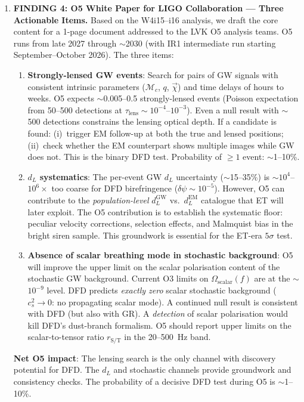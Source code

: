 \documentclass[11pt]{article}
\theoremstyle{definition}
\theoremstyle{remark}
\begin{document}
\begin{tcolorbox}[colback=blue!5!white, colframe=blue!60!black,
  title=\textbf{TOP 5 FINDINGS --- W4i17 P6 (Ranked by Impact)}]
\begin{enumerate}[nosep]
\item \textbf{FINDING 4: O5 White Paper for LIGO Collaboration ---
  Three Actionable Items.}
  Based on the W4i15--i16 analysis, we draft the core content for a
  1-page document addressed to the LVK O5 analysis teams. O5 runs
  from late 2027 through $\sim$2030 (with IR1 intermediate run starting
  September--October 2026). The three items:
  \begin{enumerate}[nosep, label=(\alph*)]
  \item \textbf{Strongly-lensed GW events}: Search for pairs of GW
    signals with consistent intrinsic parameters ($\mathcal{M}_c$,
    $q$, $\vec{\chi}$) and time delays of hours to weeks. O5 expects
    $\sim$0.005--0.5 strongly-lensed events (Poisson expectation from
    50--500 detections at $\tau_{\mathrm{lens}} \sim 10^{-4}$--$10^{-3}$).
    Even a null result with $\sim$500 detections constrains the lensing
    optical depth. If a candidate is found: (i)~trigger EM follow-up at
    both the true and lensed positions; (ii)~check whether the EM
    counterpart shows multiple images while GW does not. This is the
    binary DFD test. Probability of $\geq 1$ event: $\sim$1--10\%.
  \item \textbf{$d_L$ systematics}: The per-event GW $d_L$ uncertainty
    ($\sim$15--35\%) is $\sim$$10^4$--$10^6\times$ too coarse for DFD
    birefringence ($\delta\psi \sim 10^{-5}$). However, O5 can
    contribute to the \emph{population-level} $d_L^{\mathrm{GW}}$ vs.\
    $d_L^{\mathrm{EM}}$ catalogue that ET will later exploit. The O5
    contribution is to establish the systematic floor: peculiar velocity
    corrections, selection effects, and Malmquist bias in the bright
    siren sample. This groundwork is essential for the ET-era $5\sigma$
    test.
  \item \textbf{Absence of scalar breathing mode in stochastic
    background}: O5 will improve the upper limit on the scalar
    polarisation content of the stochastic GW background. Current O3
    limits on $\Omega_{\mathrm{scalar}}(f)$ are at the $\sim$$10^{-9}$
    level. DFD predicts \emph{exactly zero} scalar stochastic
    background ($c_s^2 \to 0$: no propagating scalar mode). A continued
    null result is consistent with DFD (but also with GR). A
    \emph{detection} of scalar polarisation would kill DFD's dust-branch
    formalism. O5 should report upper limits on the scalar-to-tensor
    ratio $r_{\mathrm{S/T}}$ in the 20--500~Hz band.
  \end{enumerate}
  \textbf{Net O5 impact}: The lensing search is the only channel with
  discovery potential for DFD. The $d_L$ and stochastic channels provide
  groundwork and consistency checks. The probability of a decisive DFD
  test during O5 is $\sim$1--10\%.


\end{enumerate}
\end{tcolorbox}
\end{document}
